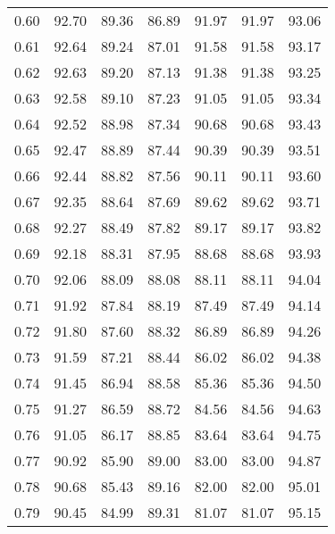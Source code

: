 \begin{tabular}{|c|c|c|c|c|c|c|}
      0.60 &     92.70 &     89.36 &      86.89 &   91.97 &      91.97 &         93.06 \\
      0.61 &     92.64 &     89.24 &      87.01 &   91.58 &      91.58 &         93.17 \\
      0.62 &     92.63 &     89.20 &      87.13 &   91.38 &      91.38 &         93.25 \\
      0.63 &     92.58 &     89.10 &      87.23 &   91.05 &      91.05 &         93.34 \\
      0.64 &     92.52 &     88.98 &      87.34 &   90.68 &      90.68 &         93.43 \\
      0.65 &     92.47 &     88.89 &      87.44 &   90.39 &      90.39 &         93.51 \\
      0.66 &     92.44 &     88.82 &      87.56 &   90.11 &      90.11 &         93.60 \\
      0.67 &     92.35 &     88.64 &      87.69 &   89.62 &      89.62 &         93.71 \\
      0.68 &     92.27 &     88.49 &      87.82 &   89.17 &      89.17 &         93.82 \\
      0.69 &     92.18 &     88.31 &      87.95 &   88.68 &      88.68 &         93.93 \\
      0.70 &     92.06 &     88.09 &      88.08 &   88.11 &      88.11 &         94.04 \\
      0.71 &     91.92 &     87.84 &      88.19 &   87.49 &      87.49 &         94.14 \\
      0.72 &     91.80 &     87.60 &      88.32 &   86.89 &      86.89 &         94.26 \\
      0.73 &     91.59 &     87.21 &      88.44 &   86.02 &      86.02 &         94.38 \\
      0.74 &     91.45 &     86.94 &      88.58 &   85.36 &      85.36 &         94.50 \\
      0.75 &     91.27 &     86.59 &      88.72 &   84.56 &      84.56 &         94.63 \\
      0.76 &     91.05 &     86.17 &      88.85 &   83.64 &      83.64 &         94.75 \\
      0.77 &     90.92 &     85.90 &      89.00 &   83.00 &      83.00 &         94.87 \\
      0.78 &     90.68 &     85.43 &      89.16 &   82.00 &      82.00 &         95.01 \\
      0.79 &     90.45 &     84.99 &      89.31 &   81.07 &      81.07 &         95.15 \\

\end{tabular}
